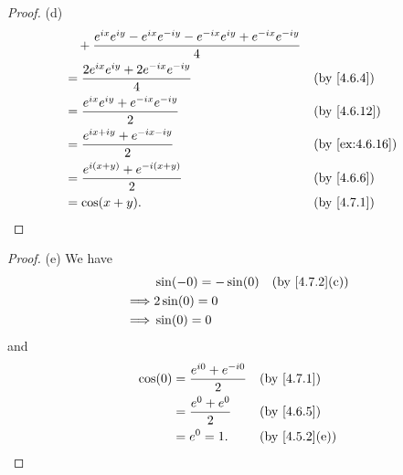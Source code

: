 \begin{proof}{(d)}
\begin{align*}
     & \quad + \dfrac{e^{i x} e^{i y} - e^{i x} e^{- i y} - e^{- i x} e^{i y} + e^{- i x} e^{- i y}}{4}                                                      \\
     & = \dfrac{2 e^{i x} e^{i y} + 2 e^{- i x} e^{- i y}}{4}                                                                            &  & \by{4.6.4}     \\
     & = \dfrac{e^{i x} e^{i y} + e^{- i x} e^{- i y}}{2}                                                                                &  & \by{4.6.12}    \\
     & = \dfrac{e^{i x + i y} + e^{- i x - i y}}{2}                                                                                      &  & \by{ex:4.6.16} \\
     & = \dfrac{e^{i (x + y)} + e^{- i (x + y)}}{2}                                                                                      &  & \by{4.6.6}     \\
     & = \cos(x + y).                                                                                                                    &  & \by{4.7.1}
  \end{align*}
\end{proof}

\begin{proof}{(e)}
  We have
  \begin{align*}
             & \sin(-0) = -\sin(0) &  & \text{(by \cref{4.7.2}(c))} \\
    \implies & 2 \sin(0) = 0                                        \\
    \implies & \sin(0) = 0
  \end{align*}
  and
  \begin{align*}
    \cos(0) & = \dfrac{e^{i 0} + e^{- i 0}}{2} &  & \by{4.7.1}                  \\
            & = \dfrac{e^{0} + e^{0}}{2}       &  & \by{4.6.5}                  \\
            & = e^0 = 1.                       &  & \text{(by \cref{4.5.2}(e))}
  \end{align*}
\end{proof}

